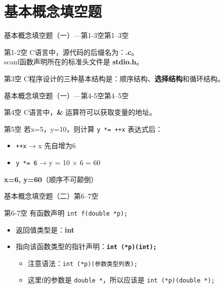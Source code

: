 \section{基本概念填空题}

\begin{frame}{基本概念填空题（一）---第1-3空}{第1--3空}
    \begin{exampleblock}{第1-2空}
        C语言中，源代码的后缀名为：\textbf{.c}。\\
        scanf函数声明所在的标准头文件是 \textbf{stdio.h}。
    \end{exampleblock}
    \pause
    \begin{exampleblock}{第3空}
        C程序设计的三种基本结构是：顺序结构、\textbf{选择结构}和循环结构。
    \end{exampleblock}
\end{frame}

\begin{frame}{基本概念填空题（一）---第4-5空}{第4--5空}
    \begin{exampleblock}{第4空}
        C语言中，\textbf{\&} 运算符可以获取变量的地址。
    \end{exampleblock}
    \pause
    \begin{exampleblock}{第5空}
        若x=5，y=10，则计算 \texttt{y *= ++x} 表达式后：
        \begin{itemize}
            \item \texttt{++x} → x 先自增为6
            \item \texttt{y *= 6} → y = 10 × 6 = 60
        \end{itemize}
        \textbf{x=6, y=60}（顺序不可颠倒）
    \end{exampleblock}
\end{frame}

\begin{frame}{基本概念填空题（二）}{第6--7空}
    \begin{exampleblock}{第6-7空}
        \small 有函数声明 \texttt{int f(double *p);}
        \begin{itemize}
            \setlength{\itemsep}{0pt}
            \item 返回值类型是：\textbf{int}
            \item 指向该函数类型的指针声明：\texttt{\textbf{int (*p)(int);}}
            \begin{itemize}
                \setlength{\itemsep}{0pt}
                \item 注意语法：\texttt{int (*p)(参数类型列表);}
                \item 这里f的参数是 \texttt{double *}，所以应该是 \texttt{int (*p)(double *);}
            \end{itemize}
        \end{itemize}
    \end{exampleblock}
\end{frame}

